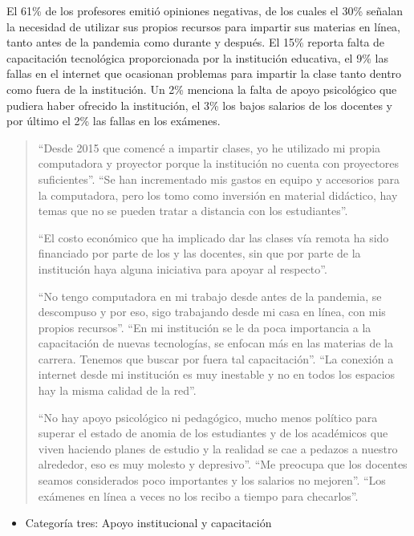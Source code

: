 \documentclass[spanish]{textolivre}
\begin{document}
El 61\% de los profesores emitió opiniones negativas, de los cuales el 30\% señalan la necesidad de utilizar sus propios recursos para impartir sus materias en línea, tanto antes de la pandemia como durante y después. El 15\% reporta falta de capacitación tecnológica proporcionada por la institución educativa, el 9\% las fallas en el internet que ocasionan problemas para impartir la clase tanto dentro como fuera de la institución. Un 2\% menciona la falta de apoyo psicológico que pudiera haber ofrecido la institución, el 3\% los bajos salarios de los docentes y por último el 2\% las fallas en los exámenes.
\begin{quote}
 “Desde 2015 que comencé a impartir clases, yo he utilizado mi propia computadora y proyector porque la institución no cuenta con proyectores suficientes”. “Se han incrementado mis gastos en equipo y accesorios para la computadora, pero los tomo como inversión en material didáctico, hay temas que no se pueden tratar a distancia con los estudiantes”. 
 
“El costo económico que ha implicado dar las clases vía remota ha sido financiado por parte de los y las docentes, sin que por parte de la institución haya alguna iniciativa para apoyar al respecto”. 

“No tengo computadora en mi trabajo desde antes de la pandemia, se descompuso y por eso, sigo trabajando desde mi casa en línea, con mis propios recursos”. “En mi institución se le da poca importancia a la capacitación de nuevas tecnologías, se enfocan más en las materias de la carrera. Tenemos que buscar por fuera tal capacitación”. “La conexión a internet desde mi institución es muy inestable y no en todos los espacios hay la misma calidad de la red”. 

“No hay apoyo psicológico ni pedagógico, mucho menos político para superar el estado de anomia de los estudiantes y de los académicos que viven haciendo planes de estudio y la realidad se cae a pedazos a nuestro alrededor, eso es muy molesto y depresivo”. “Me preocupa que los docentes seamos considerados poco importantes y los salarios no mejoren”. “Los exámenes en línea a veces no los recibo a tiempo para checarlos”. 
\end{quote}


\begin{itemize}
 \item Categoría tres: Apoyo institucional y capacitación
\end{itemize}
\end{document}
